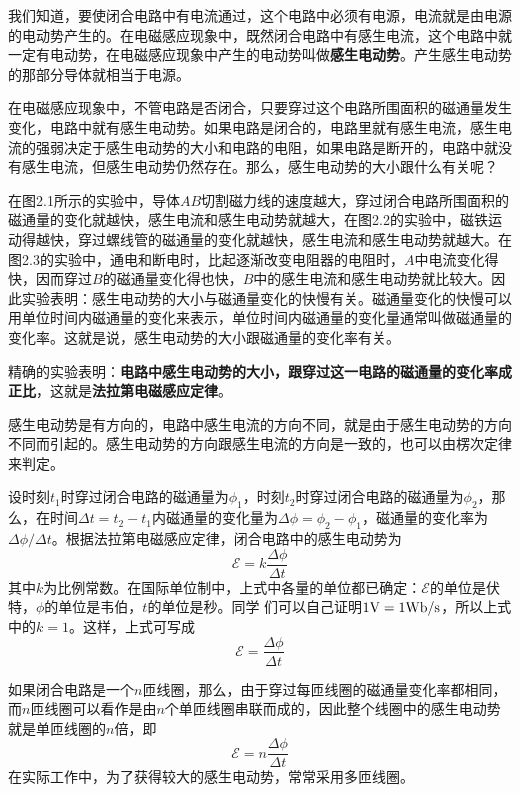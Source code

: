 我们知道，要使闭合电路中有电流通过，这个电路中必须有电源，电流就是由电源的电动势产生的。在电磁感应现象中，既然闭合电路中有感生电流，这个电路中就一定有电动势，在电磁感应现象中产生的电动势叫做\textbf{感生电动势}。产生感生电动势的那部分导体就相当于电源。

在电磁感应现象中，不管电路是否闭合，只要穿过这个电路所围面积的磁通量发生变化，电路中就有感生电动势。如果电路是闭合的，电路里就有感生电流，感生电流的强弱决定于感生电动势的大小和电路的电阻，如果电路是断开的，电路中就没有感生电流，但感生电动势仍然存在。那么，感生电动势的大小跟什么有关呢？

在图2.1所示的实验中，导体$AB$切割磁力线的速度越大，穿过闭合电路所围面积的磁通量的变化就越快，感生电流和感生电动势就越大，在图2.2的实验中，磁铁运动得越快，穿过螺线管的磁通量的变化就越快，感生电流和感生电动势就越大。在图2.3的实验中，通电和断电时，比起逐渐改变电阻器的电阻时，$A$中电流变化得快，因而穿过$B$的磁通量变化得也快，$B$中的感生电流和感生电动势就比较大。因此实验表明：感生电动势的大小与磁通量变化的快慢有关。磁通量变化的快慢可以用单位时间内磁通量的变化来表示，单位时间内磁通量的变化量通常叫做磁通量的变化率。这就是说，感生电动势的大小跟磁通量的变化率有关。

精确的实验表明：\textbf{电路中感生电动势的大小，跟穿过这一电路的磁通量的变化率成正比}，这就是\textbf{法拉第电磁感应定律}。

感生电动势是有方向的，电路中感生电流的方向不同，就是由于感生电动势的方向不同而引起的。感生电动势的方向跟感生电流的方向是一致的，也可以由楞次定律来判定。

设时刻$t_1$时穿过闭合电路的磁通量为$\phi_1$，时刻$t_2$时穿过闭合电路的磁通量为$\phi_2$，那么，在时间$\Delta t=t_2-t_1$内磁通量的变化量为$\Delta \phi=\phi_2-\phi_1$，磁通量的变化率为$\Delta \phi/\Delta t$。根据法拉第电磁感应定律，闭合电路中的感生电动势为
\[\mathcal{E}=k\frac{\Delta \phi}{\Delta t}\]
其中$k$为比例常数。在国际单位制中，上式中各量的单位都已确定：$\mathcal{E}$的单位是伏特，$\phi$的单位是韦伯，$t$的单位是秒。同学
们可以自己证明$1{\rm V}=1{\rm Wb}/{\rm s}$，所以上式中的$k=1$。这样，上式可写成
\begin{equation}
    \mathcal{E}=\frac{\Delta \phi}{\Delta t}
\end{equation}

如果闭合电路是一个$n$匝线圈，那么，由于穿过每匝线圈的磁通量变化率都相同，而$n$匝线圈可以看作是由$n$个单匝线圈串联而成的，因此整个线圈中的感生电动势就是单匝线圈的$n$倍，即
\begin{equation}
    \mathcal{E}=n\frac{\Delta \phi}{\Delta t}
\end{equation}
在实际工作中，为了获得较大的感生电动势，常常采用多匝线圈。


